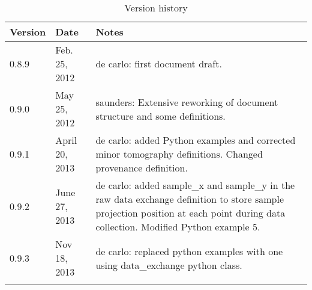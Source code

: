 
\begin{longtable}{p{1.2cm} p{2.6cm}  p{9.9cm}}
\caption{Version history} \\
\bfseries Version & \bfseries Date & \bfseries Notes \\ 
\endhead
\toprule
0.8.9 & Feb. 25, 2012 & de carlo: first document draft. \\
0.9.0 & May 25, 2012 & saunders: Extensive reworking of document structure and some definitions. \\
0.9.1 & April 20, 2013 & de carlo: added Python examples and corrected minor tomography definitions. Changed provenance definition.\\
0.9.2 & June 27, 2013 & de carlo: added sample\_x and sample\_y in the raw data exchange definition to store sample projection position at each point during data collection. Modified Python example 5.\\
0.9.3 & Nov 18, 2013 & de carlo: replaced python examples with one using data\_exchange python class.\\
\bottomrule
\label{table:SI}
\end{longtable}
